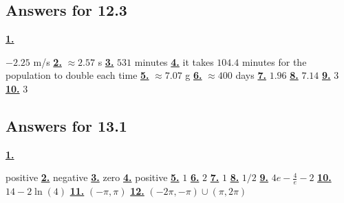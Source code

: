 \subsection *{Answers for 12.3}
\hypertarget {a:12.3.1}{\hyperlink {e:12.3.1}{\bfseries 1.}} \mdseries $-2.25$ m/s\qquad 
\hypertarget {a:12.3.2}{\hyperlink {e:12.3.2}{\bfseries 2.}} \mdseries $\approx 2.57$ s\qquad 
\hypertarget {a:12.3.3}{\hyperlink {e:12.3.3}{\bfseries 3.}} \mdseries $531$ minutes\qquad 
\hypertarget {a:12.3.4}{\hyperlink {e:12.3.4}{\bfseries 4.}} \mdseries it takes $104.4$ minutes for the population to double each time\qquad 
\hypertarget {a:12.3.5}{\hyperlink {e:12.3.5}{\bfseries 5.}} \mdseries $\approx 7.07$ g\qquad 
\hypertarget {a:12.3.6}{\hyperlink {e:12.3.6}{\bfseries 6.}} \mdseries $\approx 400$ days\qquad 
\hypertarget {a:12.3.7}{\hyperlink {e:12.3.7}{\bfseries 7.}} \mdseries $1.96$\qquad 
\hypertarget {a:12.3.8}{\hyperlink {e:12.3.8}{\bfseries 8.}} \mdseries $7.14$\qquad 
\hypertarget {a:12.3.9}{\hyperlink {e:12.3.9}{\bfseries 9.}} \mdseries $3$\qquad 
\hypertarget {a:12.3.10}{\hyperlink {e:12.3.10}{\bfseries 10.}} \mdseries $3$\qquad 
\subsection *{Answers for 13.1}
\hypertarget {a:13.1.1}{\hyperlink {e:13.1.1}{\bfseries 1.}} \mdseries positive\qquad 
\hypertarget {a:13.1.2}{\hyperlink {e:13.1.2}{\bfseries 2.}} \mdseries negative\qquad 
\hypertarget {a:13.1.3}{\hyperlink {e:13.1.3}{\bfseries 3.}} \mdseries zero\qquad 
\hypertarget {a:13.1.4}{\hyperlink {e:13.1.4}{\bfseries 4.}} \mdseries positive\qquad 
\hypertarget {a:13.1.5}{\hyperlink {e:13.1.5}{\bfseries 5.}} \mdseries $1$\qquad 
\hypertarget {a:13.1.6}{\hyperlink {e:13.1.6}{\bfseries 6.}} \mdseries $2$\qquad 
\hypertarget {a:13.1.7}{\hyperlink {e:13.1.7}{\bfseries 7.}} \mdseries $1$\qquad 
\hypertarget {a:13.1.8}{\hyperlink {e:13.1.8}{\bfseries 8.}} \mdseries $1/2$\qquad 
\hypertarget {a:13.1.9}{\hyperlink {e:13.1.9}{\bfseries 9.}} \mdseries $4e - \frac {4}{e} - 2$\qquad 
\hypertarget {a:13.1.10}{\hyperlink {e:13.1.10}{\bfseries 10.}} \mdseries $14 -2 \ln (4)$\qquad 
\hypertarget {a:13.1.11}{\hyperlink {e:13.1.11}{\bfseries 11.}} \mdseries $(-\pi ,\pi )$\qquad 
\hypertarget {a:13.1.12}{\hyperlink {e:13.1.12}{\bfseries 12.}} \mdseries $(-2\pi ,-\pi )\cup (\pi ,2\pi )$\qquad 
